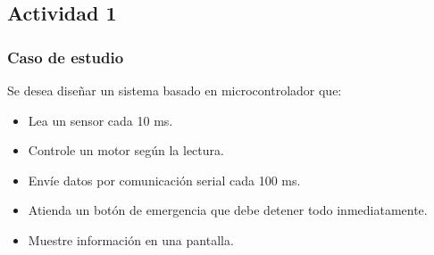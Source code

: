 
\subsection{Actividad 1} %

\subsubsection{Caso de estudio}

Se desea diseñar un sistema basado en microcontrolador que:
\begin{itemize}
    \item Lea un sensor cada 10 ms.
    \item Controle un motor según la lectura.
    \item Envíe datos por comunicación serial cada 100 ms.
    \item Atienda un botón de emergencia que debe detener todo inmediatamente.
    \item Muestre información en una pantalla.
\end{itemize}
\vspace{0.3cm}

